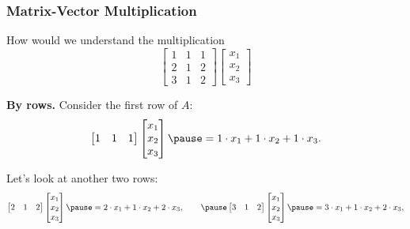 \begin{frame}
  \frametitle{Matrix-Vector Multiplication}
  How would we understand the multiplication
  \[
  \begin{bmatrix}
    1 & 1 & 1 \\
    2 & 1 & 2 \\
    3 & 1 & 2
  \end{bmatrix}
  \begin{bmatrix}
    x_1\\
    x_2\\
    x_3
  \end{bmatrix}
  \]
  \pause

  {\bf By rows.}  Consider the first row of $A$:
  \pause
  \[
  \begin{bmatrix}
    1 & 1 & 1
  \end{bmatrix}
  \begin{bmatrix}
    x_1\\
    x_2\\
    x_3
  \end{bmatrix}
  \pause
  =1\cdot x_1 + 1\cdot x_2 + 1\cdot x_3.
  \]

  Let's look at another two rows:
  {\footnotesize
  \[
  \begin{bmatrix}
    2 & 1 & 2
  \end{bmatrix}
  \begin{bmatrix}
    x_1\\
    x_2\\
    x_3
  \end{bmatrix}
  \pause
  =2\cdot x_1 + 1\cdot x_2 + 2\cdot x_3,
  \ \ \ \ \ \
  \pause
  \begin{bmatrix}
    3 & 1 & 2
  \end{bmatrix}
  \begin{bmatrix}
    x_1\\
    x_2\\
    x_3
  \end{bmatrix}
  \pause
  =3\cdot x_1 + 1\cdot x_2 + 2\cdot x_3,
  \]
  }
\end{frame}

